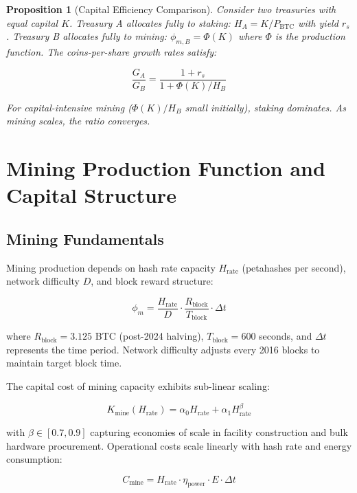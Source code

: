 \documentclass[
  journal=medium,
  manuscript=article-type,
  year=2025,
  volume=1,
]{cup-journal}
\newtheorem{proposition}[theorem]{Proposition}
\theoremstyle{definition}
\begin{document}
\begin{proposition}[Capital Efficiency Comparison]
Consider two treasuries with equal capital $K$. Treasury A allocates fully to staking: $H_A = K / P_{\text{BTC}}$ with yield $r_s$. Treasury B allocates fully to mining: $\phi_{m,B} = \Phi(K)$ where $\Phi$ is the production function. The coins-per-share growth rates satisfy:

\begin{equation}
\frac{G_A}{G_B} = \frac{1 + r_s}{1 + \Phi(K) / H_B}
\end{equation}

For capital-intensive mining ($\Phi(K) / H_B$ small initially), staking dominates. As mining scales, the ratio converges.
\end{proposition}

\section{Mining Production Function and Capital Structure}

\subsection{Mining Fundamentals}

Mining production depends on hash rate capacity $H_{\text{rate}}$ (petahashes per second), network difficulty $D$, and block reward structure:

\begin{equation}
\phi_m = \frac{H_{\text{rate}}}{D} \cdot \frac{R_{\text{block}}}{T_{\text{block}}} \cdot \Delta t
\end{equation}

where $R_{\text{block}} = 3.125$ BTC (post-2024 halving), $T_{\text{block}} = 600$ seconds, and $\Delta t$ represents the time period. Network difficulty adjusts every 2016 blocks to maintain target block time.

The capital cost of mining capacity exhibits sub-linear scaling:

\begin{equation}
K_{\text{mine}}(H_{\text{rate}}) = \alpha_0 H_{\text{rate}} + \alpha_1 H_{\text{rate}}^{\beta}
\end{equation}

with $\beta \in [0.7, 0.9]$ capturing economies of scale in facility construction and bulk hardware procurement. Operational costs scale linearly with hash rate and energy consumption:

\begin{equation}
C_{\text{mine}} = H_{\text{rate}} \cdot \eta_{\text{power}} \cdot E \cdot \Delta t
\end{equation}
\end{document}
